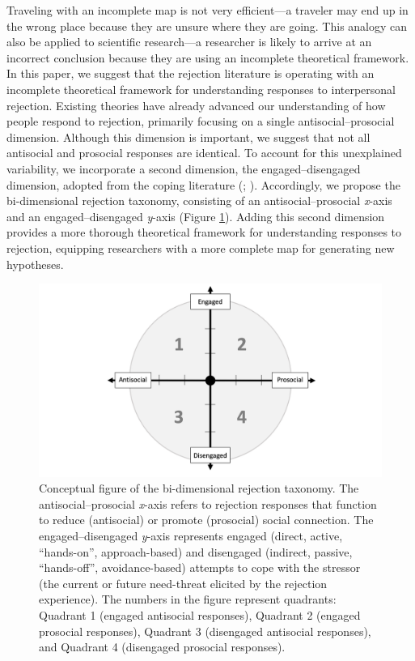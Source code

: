 \documentclass[
]{udthesis}
\begin{document}
Traveling with an incomplete map is not very efficient---a traveler may
end up in the wrong place because they are unsure where they are going.
This analogy can also be applied to scientific research---a researcher
is likely to arrive at an incorrect conclusion because they are using an
incomplete theoretical framework. In this paper, we suggest that the
rejection literature is operating with an incomplete theoretical
framework for understanding responses to interpersonal rejection.
Existing theories have already advanced our understanding of how people
respond to rejection, primarily focusing on a single
antisocial--prosocial dimension. Although this dimension is important,
we suggest that not all antisocial and prosocial responses are
identical. To account for this unexplained variability, we incorporate a
second dimension, the engaged--disengaged dimension, adopted from the
coping literature (; ). Accordingly, we propose
the bi-dimensional rejection taxonomy, consisting of an
antisocial--prosocial \emph{x}-axis and an engaged--disengaged \emph{y}-axis
(Figure \ref{fig:bidr-all}). Adding this second dimension provides a
more thorough theoretical framework for understanding responses to
rejection, equipping researchers with a more complete map for generating
new hypotheses.



\begin{figure}
\includegraphics[width=1\linewidth]{images/bidr-all} \caption{Conceptual figure of the bi-dimensional rejection taxonomy. The antisocial--prosocial \emph{x}-axis refers to rejection responses that function to reduce (antisocial) or promote (prosocial) social connection. The engaged--disengaged \emph{y}-axis represents engaged (direct, active, ``hands-on'', approach-based) and disengaged (indirect, passive, ``hands-off'', avoidance-based) attempts to cope with the stressor (the current or future need-threat elicited by the rejection experience). The numbers in the figure represent quadrants: Quadrant 1 (engaged antisocial responses), Quadrant 2 (engaged prosocial responses), Quadrant 3 (disengaged antisocial responses), and Quadrant 4 (disengaged prosocial responses).}\label{fig:bidr-all}
\end{figure}
\end{document}
